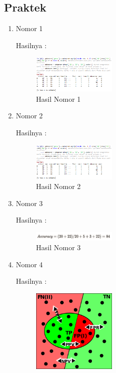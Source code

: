 \subsection{Praktek}
\begin{enumerate}
\item Nomor 1
	\hfill\break
	
	Hasilnya :
	\begin{figure}[H]
		\includegraphics[width=4cm]{figures/1174053/2/2.png}
		\centering
		\caption{Hasil Nomor 1}
	\end{figure}
\item Nomor 2
	\hfill\break
	
	Hasilnya :
	\begin{figure}[H]
		\includegraphics[width=4cm]{figures/1174053/2/2.png}
		\centering
		\caption{Hasil Nomor 2}
	\end{figure}
\item Nomor 3
		\hfill\break
		
	Hasilnya :
	\begin{figure}[H]
		\includegraphics[width=4cm]{figures/1174053/2/akurasi.png}
		\centering
		\caption{Hasil Nomor 3}
	\end{figure}
\item Nomor 4
		\hfill\break
		
	Hasilnya :
	\begin{figure}[H]
		\includegraphics[width=4cm]{figures/1174053/2/binary.png}

\end{figure}
\end{enumerate}
